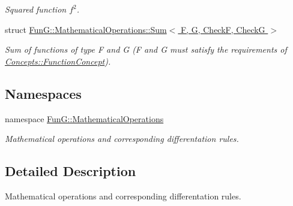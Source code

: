 \begin{DoxyCompactItemize}
\begin{DoxyCompactList}\small\item\em \-Squared function $f^2$. \end{DoxyCompactList}\item 
struct \hyperlink{structFunG_1_1MathematicalOperations_1_1Sum}{\-Fun\-G\-::\-Mathematical\-Operations\-::\-Sum$<$ F, G, Check\-F, Check\-G $>$}
\begin{DoxyCompactList}\small\item\em \-Sum of functions of type \-F and \-G (\-F and \-G must satisfy the requirements of \hyperlink{structFunG_1_1Concepts_1_1FunctionConcept}{\-Concepts\-::\-Function\-Concept}). \end{DoxyCompactList}\end{DoxyCompactItemize}
\subsection*{\-Namespaces}
\begin{DoxyCompactItemize}
\item 
namespace \hyperlink{namespaceFunG_1_1MathematicalOperations}{\-Fun\-G\-::\-Mathematical\-Operations}
\begin{DoxyCompactList}\small\item\em \-Mathematical operations and corresponding differentation rules. \end{DoxyCompactList}\end{DoxyCompactItemize}


\subsection{\-Detailed \-Description}
\-Mathematical operations and corresponding differentation rules. 